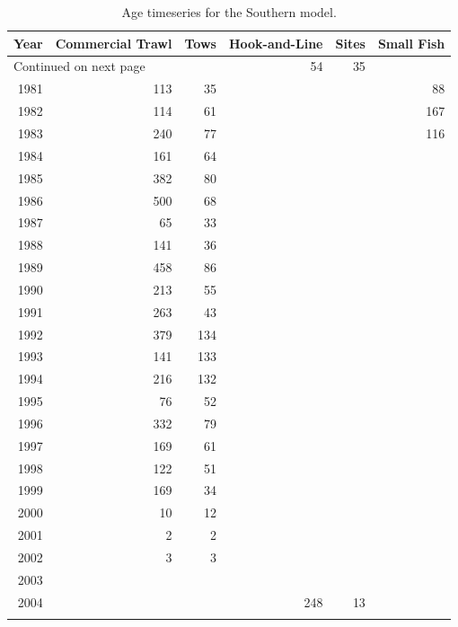 \documentclass[12pt,]{article}
\begin{document}
\begin{longtable}{rrrrrr}
\caption{Age timeseries for the Southern model.} \\ 
  \hline
Year & Commercial Trawl & Tows & Hook-and-Line & Sites & Small Fish \\ 
  \hline 
\endhead 
\hline 
\multicolumn{3}{l}{\footnotesize Continued on next page} 
\endfoot 
\endlastfoot 
 \hline
1980 &   54 &   35 &  &  &   31 \\ 
  1981 &  113 &   35 &  &  &   88 \\ 
  1982 &  114 &   61 &  &  &  167 \\ 
  1983 &  240 &   77 &  &  &  116 \\ 
  1984 &  161 &   64 &  &  &  \\ 
  1985 &  382 &   80 &  &  &  \\ 
  1986 &  500 &   68 &  &  &  \\ 
  1987 &   65 &   33 &  &  &  \\ 
  1988 &  141 &   36 &  &  &  \\ 
  1989 &  458 &   86 &  &  &  \\ 
  1990 &  213 &   55 &  &  &  \\ 
  1991 &  263 &   43 &  &  &  \\ 
  1992 &  379 &  134 &  &  &  \\ 
  1993 &  141 &  133 &  &  &  \\ 
  1994 &  216 &  132 &  &  &  \\ 
  1995 &   76 &   52 &  &  &  \\ 
  1996 &  332 &   79 &  &  &  \\ 
  1997 &  169 &   61 &  &  &  \\ 
  1998 &  122 &   51 &  &  &  \\ 
  1999 &  169 &   34 &  &  &  \\ 
  2000 &   10 &   12 &  &  &  \\ 
  2001 &    2 &    2 &  &  &  \\ 
  2002 &    3 &    3 &  &  &  \\ 
  2003 &  &  &  &  &  \\ 
  2004 &  &  &  248 &   13 &  \\ 
   \hline
\hline
\label{tab:Southern_Age}
\end{longtable}

\newpage
\end{document}
